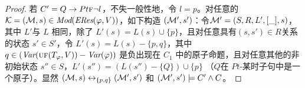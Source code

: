 \begin{proof}
	若 $C'= Q\rightarrow Pt \textsc{f} \neg l$，不失一般性地，令 $l=p$。对任意的 ${\cal K}=({\cal M}, s)\in \textit{Mod}(\emph{ERes}(\varphi,V))$，如下构造 $({\cal M}',s')$：令${\cal M}'=(S, R, L',[\_], s)$，其中 $L'$与 $L$ 相同，除了
	 $L'(s) = L(s) \cup \{p\}$，且对任意具有$(s, s')\in R$关系的状态 $s'\in S'$，令 $L'(s) = L(s) - \{p, q\}$，其中 $q \in (\textit{Var}(\textsc{uf}(T_\varphi,V))-\textit{Var}(\varphi))$ 是负出现在 $C_1$ 中的原子命题，且对任意其他的非初始状态 $s'' \in S$，$L'(s'') = (L(s'') - \{Q\}) \cup \{p\}$ （$Q$在 $Pt$-某时子句中是一个原子）。显然 $({\cal M}, s) \leftrightarrow_{\{p,q\}} ({\cal M}', s')$ 和 $({\cal M}', s') \models C' \wedge C$。
	

\end{proof}
